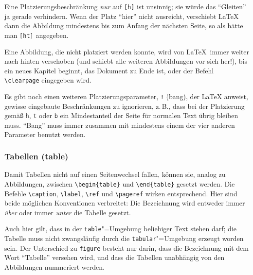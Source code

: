 Eine Platzierungsbeschränkung \emph{nur} auf \texttt{[h]} ist unsinnig;
sie würde das "`Gleiten"' ja gerade verhindern.
Wenn der Platz "`hier"' nicht ausreicht, 
verschiebt \LaTeX{} dann die Abbildung mindestens 
bis zum Anfang der nächsten Seite, so als hätte man \texttt{[ht]} angegeben.

Eine Abbildung, die nicht platziert werden konnte, wird von
\LaTeX\ immer weiter nach hinten verschoben (und schiebt alle
weiteren Abbildungen vor sich her!), bis ein neues Kapitel
beginnt, das Dokument zu Ende ist, oder der Befehl
\lstinline|\clearpage| eingegeben wird.  


Es gibt noch einen weiteren Platzierungsparameter, 
\texttt{!} (bang), der \LaTeX{} anweist,
gewisse eingebaute Beschränkungen zu ignorieren, 
z.\,B., dass bei der Platzierung gemäß \texttt{h}, \texttt{t} oder \texttt{b}
ein Mindestanteil der Seite für normalen Text übrig bleiben muss.
"`Bang"' muss immer zusammen mit mindestens einem der vier
anderen Parameter benutzt werden.  
 


\subsubsection{Tabellen (table)}

Damit Tabellen nicht auf einen Seitenwechsel fallen,
können sie, analog zu Abbildungen, zwischen
\lstinline|\begin{table}| und \lstinline|\end{table}| gesetzt werden.
Die Befehle
\lstinline|\caption|, \lstinline|\label|, \lstinline|\ref| und \lstinline|\pageref|
wirken entsprechend.
Hier sind beide möglichen Konventionen verbreitet: Die
Bezeichnung wird entweder immer \emph{über} oder immer
\emph{unter} die Tabelle gesetzt.

Auch hier gilt, dass in der \texttt{table}"=Umgebung  beliebiger
Text stehen darf; die Tabelle muss nicht zwangsläufig durch die
\texttt{tabular}"=Umgebung erzeugt worden sein.
Der Unterschied zu \texttt{figure} besteht nur darin, 
dass die Bezeichnung mit dem Wort "`Tabelle"' versehen wird,
und dass die Tabellen unabhängig von den Abbildungen nummeriert werden.

\endinput
